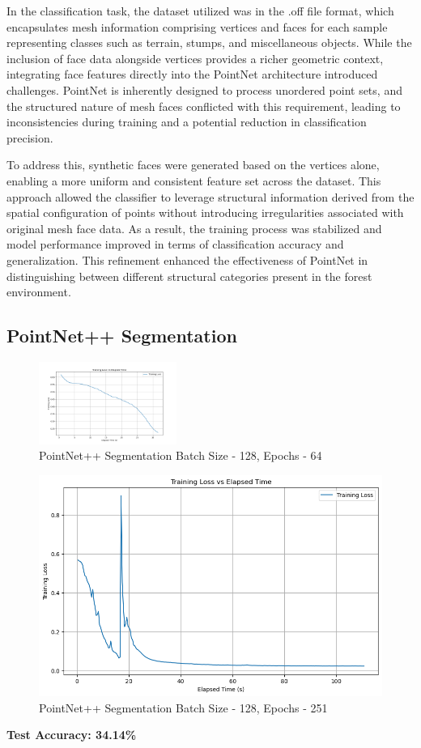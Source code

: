 \documentclass[../report.tex]{subfiles}
\begin{document}
    In the classification task, the dataset utilized was in the .off file format, which encapsulates mesh information comprising vertices and faces for each sample representing classes such as terrain, stumps, and miscellaneous objects. While the inclusion of face data alongside vertices provides a richer geometric context, integrating face features directly into the PointNet architecture introduced challenges. PointNet is inherently designed to process unordered point sets, and the structured nature of mesh faces conflicted with this requirement, leading to inconsistencies during training and a potential reduction in classification precision.\cite{pointnetclass}
    
    To address this, synthetic faces were generated based on the vertices alone, enabling a more uniform and consistent feature set across the dataset. This approach allowed the classifier to leverage structural information derived from the spatial configuration of points without introducing irregularities associated with original mesh face data. As a result, the training process was stabilized and model performance improved in terms of classification accuracy and generalization. This refinement enhanced the effectiveness of PointNet in distinguishing between different structural categories present in the forest environment.
\subsection{PointNet++ Segmentation}
\begin{figure}[H]
    \centering
    \includegraphics[width=0.4\textwidth]{rnd-project-report-main/figures/PointNetSeg_output.png}
    \caption{PointNet++ Segmentation Batch Size - 128, Epochs - 64}
\end{figure}


\begin{figure}
    \centering
    \includegraphics[width=0.7\linewidth]{rnd-project-report-main/figures/PointNetSeg_bs128_ep251.png}
    \caption{PointNet++ Segmentation Batch Size - 128, Epochs - 251}
    \label{fig:pointnetseg_bs128_ep251}
\end{figure}
    \noindent\textbf{Test Accuracy: 34.14\%}
\end{document}
